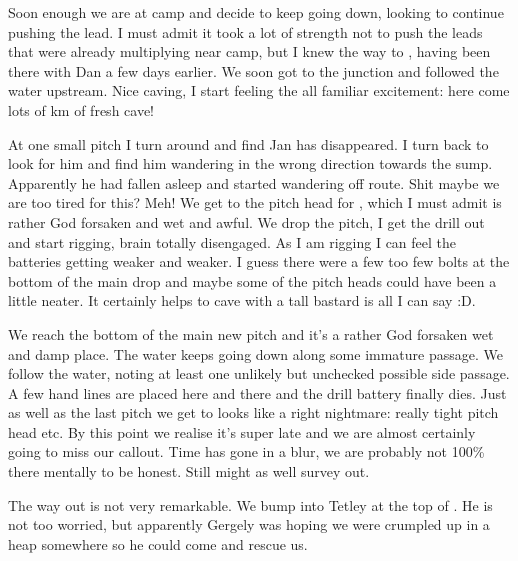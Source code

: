 Soon enough we are at camp and decide to keep going down, looking to
continue pushing the  lead. I must admit it took a lot
of strength not to push the leads that were already multiplying near
camp, but I knew the way to , having been there with Dan a
few days earlier. We soon got to the junction and followed the water
upstream. Nice caving, I start feeling the all familiar excitement: here
come lots of km of fresh cave!


At one small pitch I turn around and find Jan has disappeared. I turn
back to look for him and find him wandering in the wrong direction
towards the sump. Apparently he had fallen asleep and started wandering
off route. Shit maybe we are too tired for this? Meh! We get to the
pitch head for , which I must admit is rather God
forsaken and wet and awful. We drop the pitch, I get the drill out and
start rigging, brain totally disengaged. As I am rigging I can feel the
batteries getting weaker and weaker. I guess there were a few too few
bolts at the bottom of the main drop and maybe some of the pitch heads
could have been a little neater. It certainly helps to cave with a tall
bastard is all I can say :D.

We reach the bottom of the main new pitch and it's a rather God forsaken
wet and damp place. The water keeps going down along some immature
passage. We follow the water, noting at least one unlikely but unchecked
possible side passage. A few hand lines are placed here and there and
the drill battery finally dies. Just as well as the last pitch we get to
looks like a right nightmare: really tight pitch head etc. By this point
we realise it's super late and we are almost certainly going to miss our
callout. Time has gone in a blur, we are probably not 100\% there
mentally to be honest. Still might as well survey out.


The way out is not very remarkable. We bump into Tetley at the top of
. He is not too worried, but apparently
Gergely was hoping we were crumpled up in a heap somewhere so he could
come and rescue us.

